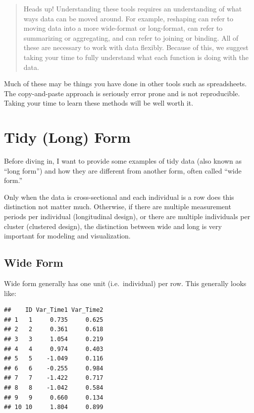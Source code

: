 \documentclass[]{tufte-book}
\theoremstyle{definition}
\theoremstyle{definition}
\theoremstyle{remark}
\begin{document}
\begin{quote}
Heads up! Understanding these tools requires an understanding of what
ways data can be moved around. For example, reshaping can refer to
moving data into a more wide-format or long-format, can refer to
summarizing or aggregating, and can refer to joining or binding. All of
these are necessary to work with data flexibly. Because of this, we
suggest taking your time to fully understand what each function is doing
with the data.
\end{quote}

Much of these may be things you have done in other tools such as
spreadsheets. The copy-and-paste approach is seriously error prone and
is not reproducible. Taking your time to learn these methods will be
well worth it.

\section*{Tidy (Long) Form}\label{tidy-long-form}

Before diving in, I want to provide some examples of tidy data (also
known as ``long form'') and how they are different from another form,
often called ``wide form.''

Only when the data is cross-sectional and each individual is a row does
this distinction not matter much. Otherwise, if there are multiple
measurement periods per individual (longitudinal design), or there are
multiple individuals per cluster (clustered design), the distinction
between wide and long is very important for modeling and visualization.

\subsection*{Wide Form}\label{wide-form}

Wide form generally has one unit (i.e.~individual) per row. This
generally looks like:

\begin{verbatim}
##    ID Var_Time1 Var_Time2
## 1   1     0.735     0.625
## 2   2     0.361     0.618
## 3   3     1.054     0.219
## 4   4     0.974     0.403
## 5   5    -1.049     0.116
## 6   6    -0.255     0.984
## 7   7    -1.422     0.717
## 8   8    -1.042     0.584
## 9   9     0.660     0.134
## 10 10     1.804     0.899
\end{verbatim}
\end{document}
